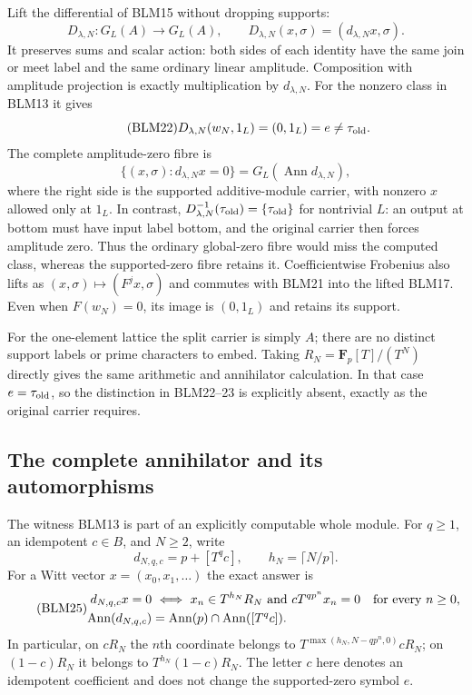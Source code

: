 Lift the differential of BLM15 without dropping supports:
\begin{equation}\tag{BLM21}
D_{\lambda,N}:G_L(A)\to G_L(A),\qquad
D_{\lambda,N}(x,\sigma)=(d_{\lambda,N}x,\sigma).
\end{equation}
It preserves sums and scalar action: both sides of each
identity have the same join or meet label and the same
ordinary linear amplitude. Composition with amplitude
projection is exactly multiplication by $d_{\lambda,N}$.
For the nonzero class in BLM13 it gives
\begin{equation}\tag{BLM22}
D_{\lambda,N}(w_N,1_L)=(0,1_L)=e\ne\tau_{\rm old}.
\end{equation}
The complete amplitude-zero fibre is
\begin{equation}\tag{BLM23}
\{(x,\sigma):d_{\lambda,N}x=0\}=G_L(\operatorname{Ann}d_{\lambda,N}),
\end{equation}
where the right side is the supported additive-module carrier,
with nonzero $x$ allowed only at $1_L$. In contrast,
$D_{\lambda,N}^{-1}(\tau_{\rm old})=\{\tau_{\rm old}\}$
for nontrivial $L$: an output at bottom must have input
label bottom, and the original carrier then forces amplitude
zero. Thus the ordinary global-zero fibre would miss the
computed class, whereas the supported-zero fibre retains it.
Coefficientwise Frobenius also lifts as
$(x,\sigma)\mapsto(F^j x,\sigma)$ and commutes with BLM21
into the lifted BLM17. Even when $F(w_N)=0$, its image is
$(0,1_L)$ and retains its support.

For the one-element lattice the split carrier is simply $A$;
there are no distinct support labels or prime characters to
embed. Taking $R_N=\mathbf F_p[T]/(T^N)$ directly gives the
same arithmetic and annihilator calculation. In that case
$e=\tau_{\rm old}$, so the distinction in BLM22--23 is
explicitly absent, exactly as the original carrier requires.

\subsection{The complete annihilator and its automorphisms}
The witness BLM13 is part of an explicitly computable whole module.
For $q\ge1$, an idempotent $c\in B$, and $N\ge2$, write
\begin{equation}\tag{BLM24}
d_{N,q,c}=p+[T^q c],\qquad h_N=\lceil N/p\rceil.
\end{equation}
For a Witt vector $x=(x_0,x_1,\ldots)$ the exact answer is
\begin{equation}\tag{BLM25}
\begin{split}
d_{N,q,c}x=0
&\ \Longleftrightarrow\ 
x_n\in T^{h_N}R_N\ \hbox{and}\ cT^{qp^n}x_n=0
\quad\hbox{for every }n\ge0,\\
\operatorname{Ann}(d_{N,q,c})
&=\operatorname{Ann}(p)\cap\operatorname{Ann}([T^qc]).
\end{split}
\end{equation}
In particular, on $cR_N$ the $n$th coordinate belongs to
$T^{\max(h_N,N-qp^n,0)}cR_N$; on $(1-c)R_N$ it belongs to
$T^{h_N}(1-c)R_N$. The letter $c$ here denotes an idempotent
coefficient and does not change the supported-zero symbol $e$.

